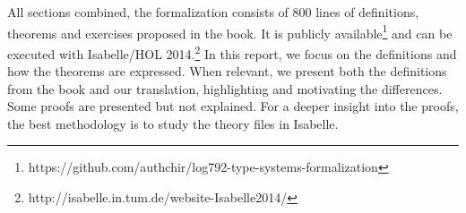 All sections combined, the formalization consists of 800 lines of definitions, theorems and
exercises proposed in the book. It is publicly available\footnote{
https://github.com/authchir/log792-type-systems-formalization} and can be executed with Isabelle/HOL
2014.\footnote{http://isabelle.in.tum.de/website-Isabelle2014/} In this report, we focus on the
definitions and how the theorems are expressed. When relevant, we present both the definitions from
the book and our translation, highlighting and motivating the differences. Some proofs are presented
but not explained. For a deeper insight into the proofs, the best methodology is to study the theory
files in Isabelle.


